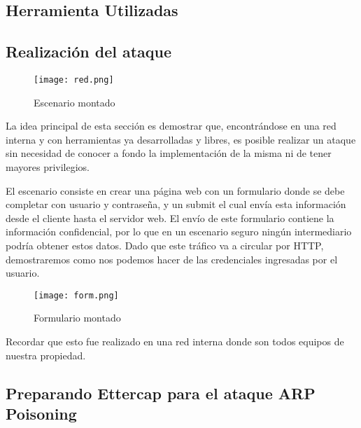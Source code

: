 
\subsection{Herramienta Utilizadas} 
    


\subsection{Realización del ataque}

\begin{center}
    \begin{figure}   
       \begin{center}
          \texttt{[image: red.png]}
       \end{center}
       \caption{Escenario montado}
    \end{figure}
 \end{center}

La idea principal de esta sección es demostrar que, encontrándose en una red interna
y con herramientas ya desarrolladas y libres, es posible realizar un ataque 
sin necesidad de conocer a fondo la implementación de la misma ni de tener mayores
privilegios.

El escenario consiste en crear una página web con un 
formulario donde se debe completar con usuario y contraseña, y un 
submit el cual envía esta información desde el cliente hasta el 
servidor web. El envío de este formulario contiene la información confidencial,
 por lo que en un escenario seguro ningún
intermediario podría obtener estos datos. Dado que este tráfico va a 
circular por HTTP, demostraremos como nos podemos hacer de las credenciales
ingresadas por el usuario.

\begin{center}
   \begin{figure}   
      \begin{center}
         \texttt{[image: form.png]}
      \end{center}
      \caption{Formulario montado}
   \end{figure}
\end{center}

Recordar que esto fue realizado en una red interna donde son todos equipos de nuestra propiedad.


\subsection{Preparando Ettercap para el ataque ARP Poisoning}

